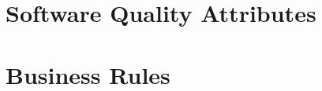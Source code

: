 \section{Software Quality Attributes}
	\begin{comment}
		$<$Specify any additional quality characteristics for the product that will be 
		important to either the customers or the developers. Some to consider are: 
		adaptability, availability, correctness, flexibility, interoperability, 
		maintainability, portability, reliability, reusability, robustness, testability, 
		and usability. Write these to be specific, quantitative, and verifiable when 
		possible. At the least, clarify the relative preferences for various attributes, 
		such as ease of use over ease of learning.$>$
	\end{comment}

\section{Business Rules}
	\begin{comment}
		$<$List any operating principles about the product, such as which individuals or 
		roles can perform which functions under specific circumstances. These are not 
		functional requirements in themselves, but they may imply certain functional 
		requirements to enforce the rules.$>$
	\end{comment}
